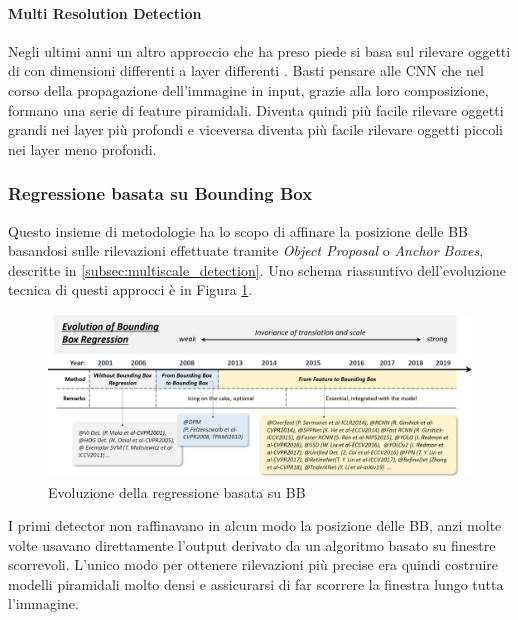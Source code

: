 \paragraph{Multi Resolution Detection}
Negli ultimi anni un altro approccio che ha preso piede si basa sul rilevare oggetti di con dimensioni differenti a layer differenti \cite{liu2016ssd, lin2017feature, zhang2018single, cai2016unified}. Basti pensare alle \ac{CNN} che nel corso della propagazione dell'immagine in input, grazie alla loro composizione, formano una serie di feature piramidali. Diventa quindi più facile rilevare oggetti grandi nei layer più profondi e viceversa diventa più facile rilevare oggetti piccoli nei layer meno profondi. 
\subsubsection{Regressione basata su Bounding Box}
Questo insieme di metodologie ha lo scopo di affinare la posizione delle \ac{BB} basandosi sulle rilevazioni effettuate tramite \textit{Object Proposal} o \textit{Anchor Boxes}, descritte in \ref{subsec:multiscale_detection}. Uno schema riassuntivo dell'evoluzione tecnica di questi approcci è in Figura \ref{fig:bbox_history}.
\begin{figure}
    \centering
    \includegraphics[width=\textwidth]{images/evol-bbreg.png}
    \caption{Evoluzione della regressione basata su \ac{BB} \cite{DBLP:journals/corr/abs-1905-05055}}
    \label{fig:bbox_history}
\end{figure}
I primi detector non raffinavano in alcun modo la posizione delle \ac{BB}, anzi molte volte usavano direttamente l'output derivato da un algoritmo basato su finestre scorrevoli. L'unico modo per ottenere rilevazioni più precise era quindi costruire modelli piramidali molto densi e assicurarsi di far scorrere la finestra lungo tutta l'immagine.
